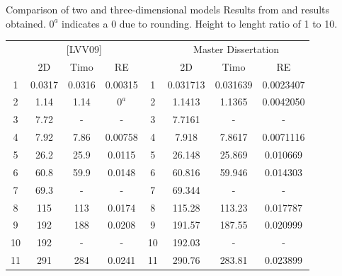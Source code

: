 \documentclass[8pt]{beamer}
\begin{document}
    
    \begin{frame}{Comparison of two and three-dimensional models}
        \centering
        \footnotesize
        \renewcommand{\arraystretch}{0.9}
        Results from \cite{LVV09} and results obtained. $0^a$ indicates a 0 due to rounding. Height to lenght ratio of 1 to 10.
    
        \begin{tabular}{cccc|cccc}
            \hline
            & \multicolumn{3}{c}{[LVV09]} & & \multicolumn{3}{c}{Master Dissertation} \\
            
            & 2D & Timo & RE & & 2D & Timo & RE \\
            \hline
            1 & 0.0317 & 0.0316 & 0.00315 & 1 & 0.031713 & 0.031639 & 0.0023407 \\
            2 & 1.14 & 1.14 & $0^a$ & 2 & 1.1413 & 1.1365 & 0.0042050 \\
            3 & 7.72 & - & - & 3 & 7.7161 & - & - \\
            4 & 7.92 & 7.86 & 0.00758 & 4 & 7.918 & 7.8617 & 0.0071116 \\
            5 & 26.2 & 25.9 & 0.0115 & 5 & 26.148 & 25.869 & 0.010669 \\
            6 & 60.8 & 59.9 & 0.0148 & 6 & 60.816 & 59.946 & 0.014303 \\
            7 & 69.3 & - & - & 7 & 69.344 & - & - \\
            8 & 115 & 113 & 0.0174 & 8 & 115.28 & 113.23 & 0.017787 \\
            9 & 192 & 188 & 0.0208 & 9 & 191.57 & 187.55 & 0.020999 \\
            10 & 192 & - & - & 10 & 192.03 & - & - \\
            11 & 291 & 284 & 0.0241 & 11 & 290.76 & 283.81 & 0.023899 \\
            \hline
        \end{tabular}
    
    \end{frame}
    
    
\end{document}
